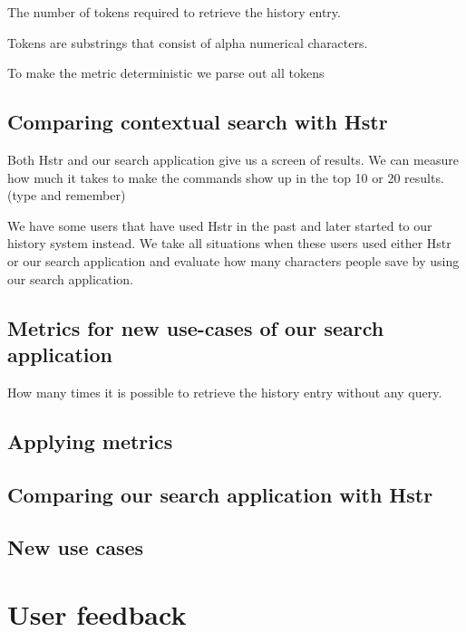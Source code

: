 The number of tokens required to retrieve the history entry.

Tokens are substrings that consist of alpha numerical characters.

To make the metric deterministic we parse out all tokens  



\subsection{Comparing contextual search with Hstr}

Both Hstr and our search application give us a screen of results. We can measure how much it takes to make the commands show up in the top 10 or 20 results. (type and remember) 


We have some users that have used Hstr \cite{toolshstr} in the past and later started to our history system instead. 
We take all situations when these users used either Hstr or our search application and evaluate how many characters people save by using our search application.

\subsection{Metrics for new use-cases of our search application}

How many times it is possible to retrieve the history entry without any query.



\subsection{Applying metrics}


\subsection{Comparing our search application with Hstr}



\subsection{New use cases}

\section{User feedback}

